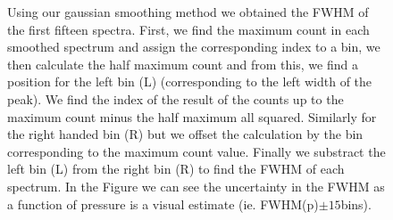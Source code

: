\documentclass[a4paper]{article}
\begin{document}
\begin{figure}
\caption{Using our gaussian smoothing method we obtained the FWHM of the first fifteen spectra.
First, we find the maximum count in each smoothed spectrum and assign the corresponding index to a bin, we then calculate the half maximum count and from this, we find a position for the left bin (L) (corresponding to the left width of the peak). 
We find the index of the result of the counts up to the maximum count minus the half maximum all squared. Similarly for the right handed bin (R) but we offset the calculation by the bin corresponding to the maximum count value. Finally we substract the left bin (L) from the right bin (R) to find the FWHM of each spectrum. In the Figure we can see the uncertainty in the FWHM as a function of pressure is a visual estimate (ie. FWHM(p)$\pm 15$bins).
}
\end{figure}
\end{document}
